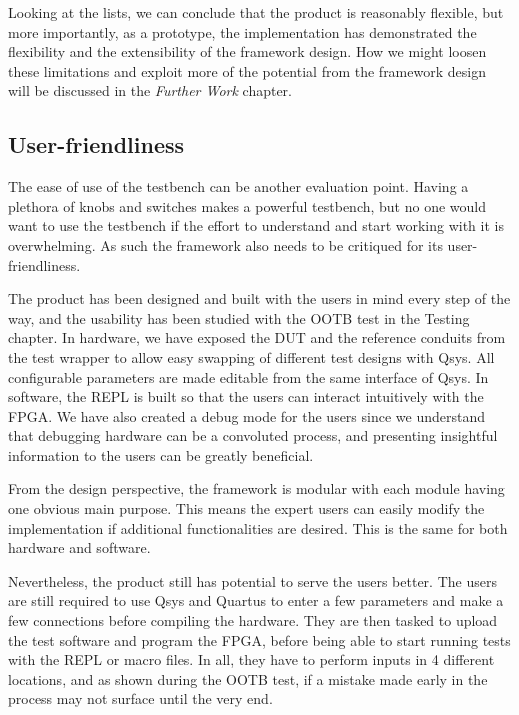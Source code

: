 Looking at the lists, we can conclude that the product is reasonably flexible, but more importantly, as a prototype, the implementation has demonstrated the flexibility and the extensibility of the framework design.
How we might loosen these limitations and exploit more of the potential from the framework design will be discussed in the \textit{Further Work} chapter.

\subsection{User-friendliness}
The ease of use of the testbench can be another evaluation point.
Having a plethora of knobs and switches makes a powerful testbench, but no one would want to use the testbench if the effort to understand and start working with it is overwhelming.
As such the framework also needs to be critiqued for its user-friendliness.

The product has been designed and built with the users in mind every step of the way, and the usability has been studied with the OOTB test in the Testing chapter.
In hardware, we have exposed the DUT and the reference conduits from the test wrapper to allow easy swapping of different test designs with Qsys.
All configurable parameters are made editable from the same interface of Qsys.
In software, the REPL is built so that the users can interact intuitively with the FPGA.
We have also created a debug mode for the users since we understand that debugging hardware can be a convoluted process, and presenting insightful information to the users can be greatly beneficial.

From the design perspective, the framework is modular with each module having one obvious main purpose.
This means the expert users can easily modify the implementation if additional functionalities are desired.
This is the same for both hardware and software.

Nevertheless, the product still has potential to serve the users better.
The users are still required to use Qsys and Quartus to enter a few parameters and make a few connections before compiling the hardware.
They are then tasked to upload the test software and program the FPGA, before being able to start running tests with the REPL or macro files.
In all, they have to perform inputs in 4 different locations, and as shown during the OOTB test, if a mistake made early in the process may not surface until the very end.

